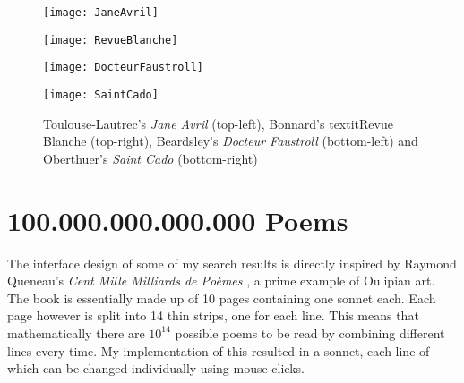 \begin{figure}[!htbp]
\centering
\begin{minipage}{.45\linewidth}
  \texttt{[image: JaneAvril]}
\end{minipage}
\hspace{.05\linewidth}
\begin{minipage}{.45\linewidth}
  \texttt{[image: RevueBlanche]}
\end{minipage}
\vspace{.05\linewidth}
\begin{minipage}{.45\linewidth}
  \texttt{[image: DocteurFaustroll]}
\end{minipage}
\hspace{.05\linewidth}
\begin{minipage}{.45\linewidth}
  \texttt{[image: SaintCado]}
\end{minipage}
\caption[Jane Avril, Revue Blanche, Docteur Faustroll and Saint Cado]{Toulouse-Lautrec's \textit{Jane Avril} (top-left), Bonnard's textit{Revue Blanche} (top-right), Beardsley's \textit{Docteur Faustroll} (bottom-left) and Oberthuer's \textit{Saint Cado} (bottom-right)}
\label{fig:libimgs}
\end{figure}


\section{100.000.000.000.000 Poems}
\label{s:queneau}

The interface design of some of my search results is directly inspired by
Raymond Queneau's \textit{Cent Mille Milliards de Poèmes} \citeyear{Queneau1961}, a prime example of Oulipian art. The book is essentially made up of \num{10} pages containing one sonnet each. Each page however is split into \num{14} thin strips, one for each line. This means that mathematically there are $10^{14}$ possible poems to be read by combining different lines every time. My implementation of this resulted in a sonnet, each line of which can be changed individually using mouse clicks.


